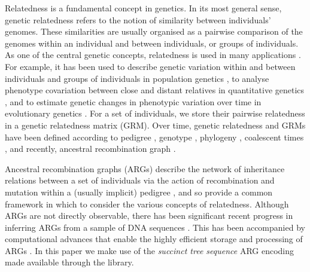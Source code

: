 

Relatedness is a fundamental concept in genetics.
%
In its most general sense, genetic relatedness refers to the notion of
similarity between individuals' genomes.
%
These similarities are usually organised as a pairwise comparison of the
genomes within an individual and between individuals, or groups of
individuals.
%
As one of the central genetic concepts, relatedness is used in many
applications \citep{weir2006genetic, speed2015relatedness}.
%
For example, it has been used to describe genetic variation within and between individuals
and groups of individuals in population genetics
\citep{crow2009introduction, charlesworth2010elements},
to analyse phenotype covariation between close and distant relatives in
quantitative genetics \citep{falconer1996introduction, lynch1998genetics},
and to estimate genetic changes in phenotypic variation over time in
evolutionary genetics \citep{walsh2018evolution, arnold2023evolutionary}.
%
For a set of individuals, we store their pairwise relatedness in a genetic relatedness matrix (GRM).
%
Over time, genetic relatedness and GRMs have been defined according to
pedigree \citep{fisher1919correlation, wright1922coefficients},
genotype \citep{cotterman1940calculus, malecot1948mathematiques, malecot1969mathemathics},
phylogeny \citep{felsenstein1985phylogenies,lynch1991methods},
coalescent times \citep{slatkin1991inbreeding}, and
recently, ancestral recombination graph \citep{tsambos2022efficient, fan2022genealogical, zhang2023biobank}.
%
    
Ancestral recombination graphs (ARGs) 
describe the network of inheritance relations between a set of individuals
via the action of recombination and mutation within a (usually implicit) pedigree
\citep{brandt2024promise, lewanski2024era, wong2023general, nielsen2024inference},
and so provide a common framework in which to consider
the various concepts of relatedness.
%
Although ARGs are not directly observable,
there has been significant recent progress in inferring ARGs from a sample of DNA sequences
\citep{rasmussen2014genome,speidel2019method, kelleher2019inferring, zhang2023biobank, deng2024robust, gunnarsson2024scalable}.
%
This has been accompanied by computational advances that enable
the highly efficient storage and processing of ARGs
\citep{kelleher2016efficient, zhu2024variance, dehaas2024enabling}.
%
In this paper we make use of the \textit{succinct tree sequence} 
ARG encoding
\citep{ralph2020efficiently, wong2023general}
made available through the \tskit{} library.

